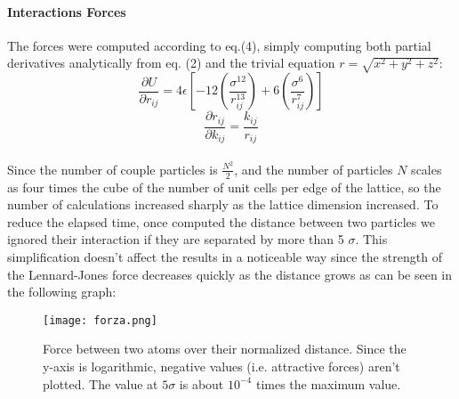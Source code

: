 \documentclass[10pt,a4paper,titlepage]{article}
\begin{document}
\paragraph{Interactions Forces} The forces were computed according to eq.(4),  simply computing both partial derivatives analytically from eq. (2) and the trivial equation $r=\sqrt{x^2+y^2+z^2}$: 
\begin{equation}
\frac{\partial U}{\partial r_{ij}}= 4\epsilon\left[-12\left(\frac{\sigma^{12}}{r_{ij}^{13}}\right) + 6\left(\frac{\sigma^{6}}{r_{ij}^7}\right)\right]
\end{equation}
\begin{equation}
\frac{\partial r_{ij}}{\partial k_{ij}} = \frac{k_{ij}}{r_{ij}}
\end{equation}
\\Since the number of couple particles is $\frac{N^2}{2}$, and the number of particles $N$ scales as four times the cube of the number of unit cells per edge of the lattice, so the number of calculations increased sharply as the lattice dimension increased. To reduce the elapsed time, once computed the distance between two particles we ignored their interaction if they are separated by more than 5 $\sigma$. This simplification doesn't affect the results in a noticeable way since the strength of the Lennard-Jones force decreases quickly as the distance grows as can be seen in the following graph:
\begin{figure}[H]
\begin{center}
    \texttt{[image: forza.png]}
\caption{Force between two atoms over their normalized distance. Since the y-axis is logarithmic, negative values (i.e. attractive forces) aren't plotted. The value at $5\sigma$ is about $10^{-4}$ times the maximum value.}
	\end{center}
\end{figure}
\end{document}
